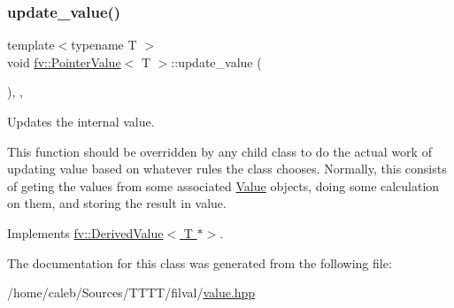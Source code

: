 \subsubsection{\texorpdfstring{update\+\_\+value()}{update\_value()}}
{\footnotesize\ttfamily template$<$typename T $>$ \\
void \hyperlink{classfv_1_1PointerValue}{fv\+::\+Pointer\+Value}$<$ T $>$\+::update\+\_\+value (\begin{DoxyParamCaption}{ }\end{DoxyParamCaption})\hspace{0.3cm}{\ttfamily [inline]}, {\ttfamily [protected]}, {\ttfamily [virtual]}}



Updates the internal value. 

This function should be overridden by any child class to do the actual work of updating value based on whatever rules the class chooses. Normally, this consists of geting the values from some associated \hyperlink{classfv_1_1Value}{Value} objects, doing some calculation on them, and storing the result in value. 

Implements \hyperlink{classfv_1_1DerivedValue_ae59e80a98eb74b95d8961bfe12ee5ec2}{fv\+::\+Derived\+Value$<$ T $\ast$$>$}.



The documentation for this class was generated from the following file\+:\begin{DoxyCompactItemize}
\item 
/home/caleb/\+Sources/\+T\+T\+T\+T/filval/\hyperlink{value_8hpp}{value.\+hpp}\end{DoxyCompactItemize}
